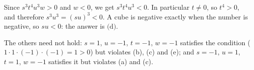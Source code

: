 Since $s^3t^4u^3w>0$ and $w<0$, we get $s^3t^4u^3<0$. In particular $t\ne0$, so $t^4>0$, and therefore $s^3u^3=(su)^3<0$. A cube is negative exactly when the number is negative, so $su<0$: the answer is $\boxed{\text{(d)}}$.

The others need not hold: $s=1$, $u=-1$, $t=-1$, $w=-1$ satisfies the condition ($1\cdot1\cdot(-1)\cdot(-1)=1>0$) but violates (b), (c) and (e); and $s=-1$, $u=1$, $t=1$, $w=-1$ satisfies it but violates (a) and (c).
